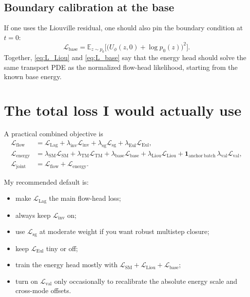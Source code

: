 \documentclass[11pt]{article}
\newcommand{\E}{\mathbb{E}}
\newcommand{\energy}{U_{\phi}}
\begin{document}
\subsection{Boundary calibration at the base}

If one uses the Liouville residual, one should also pin the boundary condition at $t=0$:
\begin{equation}
\mathcal{L}_{\mathrm{base}}
=
\E_{z \sim p_0}
\Big[
\big(
\energy(z,0) + \log p_0(z)
\big)^2
\Big].
\label{eq:L_base}
\end{equation}
Together, \eqref{eq:L_Liou} and \eqref{eq:L_base} say that the energy head should solve the same transport PDE as the normalized flow-head likelihood, starting from the known base energy.

\section{The total loss I would actually use}

A practical combined objective is
\begin{align}
\mathcal{L}_{\mathrm{flow}}
&=
\mathcal{L}_{\mathrm{Lag}}
+
\lambda_{\mathrm{inv}}\mathcal{L}_{\mathrm{inv}}
+
\lambda_{\mathrm{sg}}\mathcal{L}_{\mathrm{sg}}
+
\lambda_{\mathrm{Eul}}\mathcal{L}_{\mathrm{Eul}},
\label{eq:L_flow_total}
\\
\mathcal{L}_{\mathrm{energy}}
&=
\lambda_{\mathrm{SM}}\mathcal{L}_{\mathrm{SM}}
+
\lambda_{\mathrm{TM}}\mathcal{L}_{\mathrm{TM}}
+
\lambda_{\mathrm{base}}\mathcal{L}_{\mathrm{base}}
+
\lambda_{\mathrm{Liou}}\mathcal{L}_{\mathrm{Liou}}
+
\mathbf{1}_{\mathrm{anchor\ batch}}\,\lambda_{\mathrm{val}}\mathcal{L}_{\mathrm{val}},
\label{eq:L_energy_total}
\\
\mathcal{L}_{\mathrm{joint}}
&=
\mathcal{L}_{\mathrm{flow}} + \mathcal{L}_{\mathrm{energy}}.
\label{eq:L_joint}
\end{align}

My recommended default is:
\begin{itemize}[itemsep=0.25em,topsep=0.25em]
    \item make $\mathcal{L}_{\mathrm{Lag}}$ the main flow-head loss;
    \item always keep $\mathcal{L}_{\mathrm{inv}}$ on;
    \item use $\mathcal{L}_{\mathrm{sg}}$ at moderate weight if you want robust multistep closure;
    \item keep $\mathcal{L}_{\mathrm{Eul}}$ tiny or off;
    \item train the energy head mostly with $\mathcal{L}_{\mathrm{SM}} + \mathcal{L}_{\mathrm{Liou}} + \mathcal{L}_{\mathrm{base}}$;
    \item turn on $\mathcal{L}_{\mathrm{val}}$ only occasionally to recalibrate the absolute energy scale and cross-mode offsets.
\end{itemize}
\end{document}
